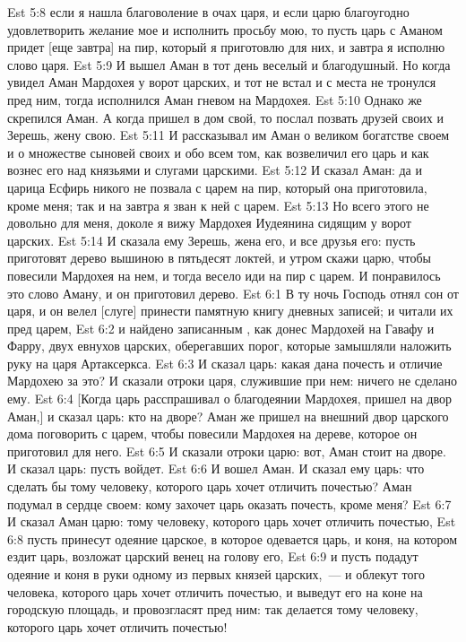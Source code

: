 \vs Est 5:8 если я нашла благоволение в очах царя, и если царю благоугодно удовлетворить желание мое и исполнить просьбу мою, то пусть царь с Аманом придет [еще завтра] на пир, который я приготовлю для них, и завтра я исполню слово царя.
\vs Est 5:9 И вышел Аман в тот день веселый и благодушный. Но когда увидел Аман Мардохея у ворот царских, и тот не встал и с места не тронулся пред ним, тогда исполнился Аман гневом на Мардохея.
\vs Est 5:10 Однако же скрепился Аман. А когда пришел в дом свой, то послал позвать друзей своих и Зерешь, жену свою.
\vs Est 5:11 И рассказывал им Аман о великом богатстве своем и о множестве сыновей своих и обо всем том, как возвеличил его царь и как вознес его над князьями и слугами царскими.
\vs Est 5:12 И сказал Аман: да и царица Есфирь никого не позвала с царем на пир, который она приготовила, кроме меня; так и на завтра я зван к ней с царем.
\vs Est 5:13 Но всего этого не довольно для меня, доколе я вижу Мардохея Иудеянина сидящим у ворот царских.
\vs Est 5:14 И сказала ему Зерешь, жена его, и все друзья его: пусть приготовят дерево вышиною в пятьдесят локтей, и утром скажи царю, чтобы повесили Мардохея на нем, и тогда весело иди на пир с царем. И понравилось это слово Аману, и он приготовил дерево.
\vs Est 6:1 В ту ночь Господь отнял сон от царя, и он велел [слуге] принести памятную книгу дневных записей; и читали их пред царем,
\vs Est 6:2 и найдено записанным , как донес Мардохей на Гавафу и Фарру, двух евнухов царских, оберегавших порог, которые замышляли наложить руку на царя Артаксеркса.
\vs Est 6:3 И сказал царь: какая дана почесть и отличие Мардохею за это? И сказали отроки царя, служившие при нем: ничего не сделано ему.
\vs Est 6:4 [Когда царь расспрашивал о благодеянии Мардохея, пришел на двор Аман,] и сказал царь: кто на дворе? Аман же пришел  на внешний двор царского дома поговорить с царем, чтобы повесили Мардохея на дереве, которое он приготовил для него.
\vs Est 6:5 И сказали отроки царю: вот, Аман стоит на дворе. И сказал царь: пусть войдет.
\vs Est 6:6 И вошел Аман. И сказал ему царь: что сделать бы тому человеку, которого царь хочет отличить почестью? Аман подумал в сердце своем: кому  захочет царь оказать почесть, кроме меня?
\vs Est 6:7 И сказал Аман царю: тому человеку, которого царь хочет отличить почестью,
\vs Est 6:8 пусть принесут одеяние царское, в которое одевается царь, и  коня, на котором ездит царь, возложат царский венец на голову его,
\vs Est 6:9 и пусть подадут одеяние и коня в руки одному из первых князей царских,~--- и облекут того человека, которого царь хочет отличить почестью, и выведут его на коне на городскую площадь, и провозгласят пред ним: так делается тому человеку, которого царь хочет отличить почестью!
